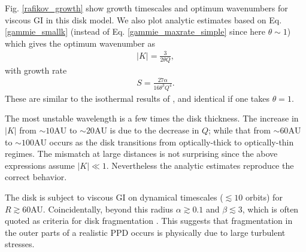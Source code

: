 Fig. \ref{rafikov_growth} show growth timescales and
optimum wavenumbers for viscous GI in this disk model.  
We also plot analytic estimates based on Eq. \ref{gammie_smallk} (instead of
Eq. \ref{gammie_maxrate_simple} since here $\theta\sim 1$) 
which gives the optimum wavenumber as
\begin{align}
  |K| = \frac{3}{2\theta Q},
\end{align}
with growth rate
\begin{align} 
  S = \frac{27\alpha}{16\theta^3Q^4}. 
\end{align}
These are similar to the isothermal results of
\citet[][their Eq. 19 and 21, respectively]{sterzik95}, and identical if one
takes $\theta=1$. 
 
The most unstable wavelength is a few times the disk thickness. The
increase in $|K|$ from $\sim 10\mathrm{AU}$ to $\sim 20\mathrm{AU}$ is
due to the decrease in $Q$; while that from $\sim 60\mathrm{AU}$ to
$\sim 100\mathrm{AU}$ occurs as the disk transitions from
optically-thick to optically-thin regimes. The mismatch at large
distances is  
not surprising since the above expressions assume $|K|\ll
1$. Nevertheless the analytic estimates reproduce the correct
behavior.  

The disk is subject to viscous GI on dynamical timescales ($\lesssim
10$ orbits) for $R\gtrsim60$AU. Coincidentally, beyond this radius
$\alpha\gtrsim 0.1$ and $\beta\lesssim 3$, which is often quoted as 
criteria for disk fragmentation \citep[e.g.][]{rafikov15}. 
This suggests that fragmentation in the outer parts of a realistic PPD
occurs is physically due to large turbulent stresses. 


